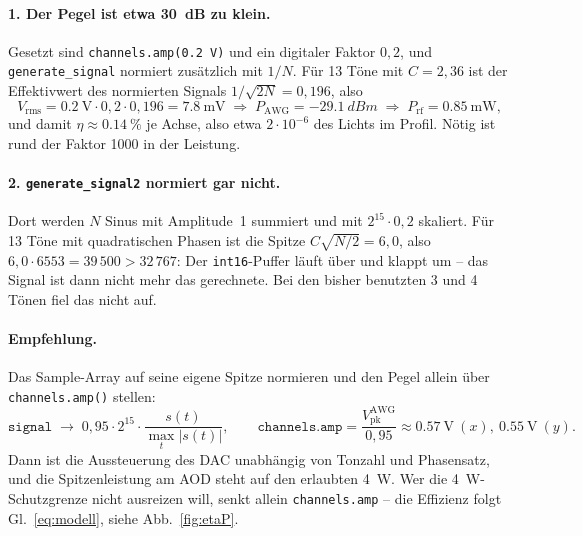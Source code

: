 \documentclass[11pt,a4paper]{article}
\newcommand{\Prf}{P_{\mathrm{rf}}}
\begin{document}
\paragraph{1. Der Pegel ist etwa \SI{30}{\deci\bel} zu klein.} Gesetzt sind
\texttt{channels.amp(0.2 V)} und ein digitaler Faktor $0{,}2$, und
\texttt{generate\_signal} normiert zusätzlich mit $1/N$. Für 13 Töne mit
$C=2{,}36$ ist der Effektivwert des normierten Signals $1/\sqrt{2N}=0{,}196$,
also
\begin{equation*}
  V_\mathrm{rms} = \SI{0,2}{\volt}\cdot 0{,}2 \cdot 0{,}196 = \SI{7,8}{\milli\volt}
  \;\Rightarrow\; P_\mathrm{AWG} = \SI{-29,1}{dBm}
  \;\Rightarrow\; \Prf = \SI{0,85}{\milli\watt},
\end{equation*}
und damit $\eta\approx\SI{0,14}{\percent}$ je Achse, also etwa
$2\cdot10^{-6}$ des Lichts im Profil. Nötig ist rund der Faktor 1000 in der
Leistung.

\paragraph{2. \texttt{generate\_signal2} normiert gar nicht.} Dort werden $N$
Sinus mit Amplitude~1 summiert und mit $2^{15}\cdot0{,}2$ skaliert. Für 13 Töne
mit quadratischen Phasen ist die Spitze
$C\sqrt{N/2}=6{,}0$, also $6{,}0\cdot6553=39\,500 > 32\,767$: Der
\texttt{int16}-Puffer läuft über und klappt um -- das Signal ist dann nicht
mehr das gerechnete. Bei den bisher benutzten 3 und 4 Tönen fiel das nicht auf.

\paragraph{Empfehlung.} Das Sample-Array auf seine eigene Spitze normieren und
den Pegel allein über \texttt{channels.amp()} stellen:
\begin{equation*}
  \texttt{signal} \;\rightarrow\; 0{,}95\cdot 2^{15}\cdot\frac{s(t)}{\max_t |s(t)|},
  \qquad
  \texttt{channels.amp} = \frac{V_\mathrm{pk}^\mathrm{AWG}}{0{,}95}
  \approx \SI{0,57}{\volt}\ (x),\ \SI{0,55}{\volt}\ (y).
\end{equation*}
Dann ist die Aussteuerung des DAC unabhängig von Tonzahl und Phasensatz, und
die Spitzenleistung am AOD steht auf den erlaubten \SI{4}{\watt}. Wer die
\SI{4}{\watt}-Schutzgrenze nicht ausreizen will, senkt allein
\texttt{channels.amp} -- die Effizienz folgt Gl.~\eqref{eq:modell}, siehe
Abb.~\ref{fig:etaP}.

\end{document}
